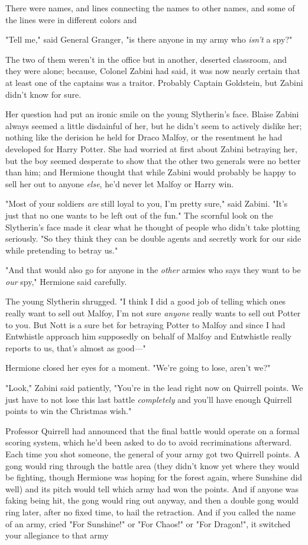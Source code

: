 There were names, and lines connecting the names to other names, and some of
the lines were in different colors and{\el}

"Tell me," said General Granger, "is there anyone in my army who \emph{isn't} a
spy?"

The two of them weren't in the office but in another, deserted classroom, and
they were alone; because, Colonel Zabini had said, it was now nearly certain
that at least one of the captains was a traitor. Probably Captain Goldstein,
but Zabini didn't know for sure.

Her question had put an ironic smile on the young Slytherin's face. Blaise
Zabini always seemed a little disdainful of her, but he didn't seem to actively
dislike her; nothing like the derision he held for Draco Malfoy, or the
resentment he had developed for Harry Potter. She had worried at first about
Zabini betraying her, but the boy seemed desperate to show that the other two
generals were no better than him; and Hermione thought that while Zabini would
probably be happy to sell her out to anyone \emph{else}, he'd never let Malfoy
or Harry win.

"Most of your soldiers \emph{are} still loyal to you, I'm pretty sure," said
Zabini. "It's just that no one wants to be left out of the fun." The scornful
look on the Slytherin's face made it clear what he thought of people who didn't
take plotting seriously. "So they think they can be double agents and secretly
work for our side while pretending to betray us."

"And that would also go for anyone in the \emph{other} armies who says they
want to be \emph{our} spy," Hermione said carefully.

The young Slytherin shrugged. "I think I did a good job of telling which ones
really want to sell out Malfoy, I'm not sure \emph{anyone} really wants to sell
out Potter to you. But Nott is a sure bet for betraying Potter to Malfoy and
since I had Entwhistle approach him supposedly on behalf of Malfoy and
Entwhistle really reports to us, that's almost as good\mbox{---}"

Hermione closed her eyes for a moment. "We're going to lose, aren't we?"

"Look," Zabini said patiently, "You're in the lead right now on Quirrell
points. We just have to not lose this last battle \emph{completely} and you'll
have enough Quirrell points to win the Christmas wish."

Professor Quirrell had announced that the final battle would operate on a
formal scoring system, which he'd been asked to do to avoid recriminations
afterward. Each time you shot someone, the general of your army got two
Quirrell points. A gong would ring through the battle area (they didn't know
yet where they would be fighting, though Hermione was hoping for the forest
again, where Sunshine did well) and its pitch would tell which army had won the
points. And if anyone was faking being hit, the gong would ring out anyway, and
then a double gong would ring later, after no fixed time, to hail the
retraction. And if you called the name of an army, cried "For Sunshine!" or
"For Chaos!" or "For Dragon!", it switched your allegiance to that army{\el}

